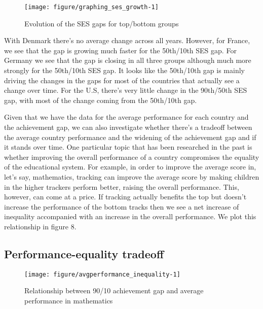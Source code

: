 \documentclass[11pt, a4paper]{article}\usepackage[]{graphicx}\usepackage[]{color}
\begin{document}
\begin{figure}
\begin{center}


{\centering \texttt{[image: figure/graphing\_ses\_growth-1]} 

}



\caption{Evolution of the SES gaps for top/bottom groups}
\end{center}
\end{figure}

With Denmark there's no average change across all years. However, for France, we see that the gap is growing much faster for the 50th/10th SES gap. For Germany we see that the gap is closing in all three groups although much more strongly for the 50th/10th SES gap. It looks like the 50th/10th gap is mainly driving the changes in the gaps for most of the countries that actually see a change over time.  For the U.S, there's very little change in the 90th/50th SES gap, with most of the change coming from the 50th/10th gap.

Given that we have the data for the average performance for each country and the achievement gap, we can also investigate whether there's a tradeoff between the average country performance and the widening of the achievement gap and if it stands over time. One particular topic that has been researched in the past is whether improving the overall performance of a country compromises the equality of the educational system. For example, in order to improve the average score in, let's say, mathematics, tracking can improve the average score by making children in the higher trackers perform better, raising the overall performance. This, however, can come at a price. If tracking actually benefits the top but doesn't increase the performance of the bottom tracks then we see a net increase of inequality accompanied with an increase in the overall performance. We plot this relationship in figure 8.

\subsection{Performance-equality tradeoff}




\begin{figure}
\begin{center}


{\centering \texttt{[image: figure/avgperformance\_inequality-1]} 

}



\caption{Relationship between 90/10 achievement gap and average performance in mathematics}
\end{center}
\end{figure}
\end{document}
